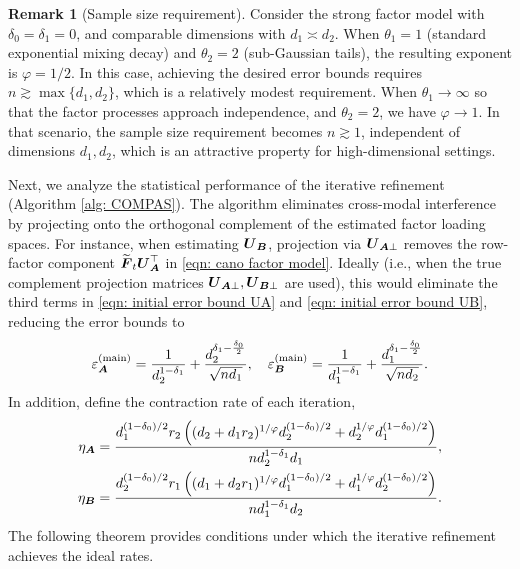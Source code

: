 \documentclass[11pt,letterpaper]{article}
\theoremstyle{definition}
\newtheorem{remark}{Remark}
\begin{document}
\begin{remark}[Sample size requirement]
Consider the strong factor model with $\delta_0=\delta_1=0$, and comparable dimensions with $d_1 \asymp d_2$. When $\theta_1 = 1$ (standard exponential mixing decay) and $\theta_2=2$ (sub-Gaussian tails), the resulting exponent is $\varphi=1/2$. In this case, achieving the desired error bounds requires $n \gtrsim \max\{d_1, d_2\}$, which is a relatively modest requirement. When $\theta_1 \to \infty$ so that the factor processes approach independence, and $\theta_2=2$, we have $\varphi \to 1$. In that scenario, the sample size requirement becomes $n\gtrsim 1$, independent of dimensions $d_1,d_2$, which is an attractive property for high-dimensional settings.
\end{remark}


Next, we analyze the statistical performance of the iterative refinement (Algorithm \ref{alg: COMPAS}). The algorithm eliminates cross-modal interference by projecting onto the orthogonal complement of the estimated factor loading spaces. For instance, when estimating $\boldsymbol{U}_{\boldsymbol{B}}$, projection via $\boldsymbol{U}_{\boldsymbol{A}\perp}$ removes the row-factor component $\widetilde{\boldsymbol{F}}_t \boldsymbol{U}_{\boldsymbol{A}}^\top$ in \eqref{eqn: cano factor model}. Ideally (i.e., when the true complement projection matrices $\boldsymbol{U}_{\boldsymbol{A}\perp},\boldsymbol{U}_{\boldsymbol{B}\perp}$ are used), this would eliminate the third terms in \eqref{eqn: initial error bound UA} and \eqref{eqn: initial error bound UB}, reducing the error bounds to
\begin{align}\label{eqn:final bdd}
\varepsilon_{\boldsymbol{A}}^{\text{(main)}} = \frac{1 }{ d_2^{1-\delta_1}} + 
\frac{ d_2^{\delta_1-\frac{\delta_{0}}{2}}}{ \sqrt{n d_1}}, \quad  \varepsilon_{\boldsymbol{B}}^{\text{(main)}} = \frac{1 }{ d_1^{1-\delta_1}} + 
\frac{ d_1^{\delta_1-\frac{\delta_{0}}{2}}}
{ \sqrt{n d_2}}     .    
\end{align}
In addition, define the contraction rate of each iteration,
\begin{align}
\eta_{\boldsymbol{A}} &= \frac{d_1^{(1-\delta_0)/2}r_2  \left((d_2+d_1r_2)^{1/\varphi} d_2^{(1-\delta_0)/2} + d_2^{1/\varphi} d_1^{(1-\delta_0)/2}\right)}{ nd_2^{1-\delta_1}d_1},  \label{eqn: contraction rate UA} \\
\eta_{\boldsymbol{B}} &= \frac{d_2^{(1-\delta_0)/2}r_1  \left((d_1+d_2r_1)^{1/\varphi} d_1^{(1-\delta_0)/2} +  d_1^{1/\varphi} d_2^{(1-\delta_0)/2}\right)}{  nd_1^{1-\delta_1}d_2}. \label{eqn: contraction rate UB}
\end{align}
The following theorem provides conditions under which the iterative refinement achieves the ideal rates.
\end{document}
